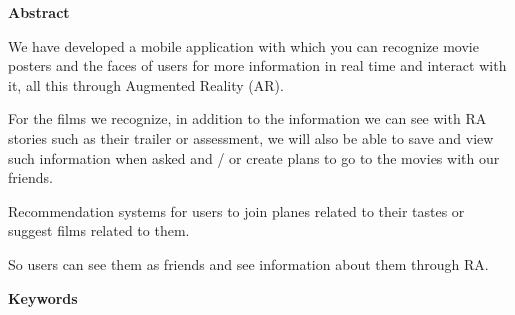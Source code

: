 
\newpage

\thispagestyle{empty}

\begin{center}

{\bf \Huge Abstract}

  \end{center}
\vspace{1cm}

We have developed a mobile application with which you can
 recognize movie posters and the faces of users for more
 information in real time and interact with it, all this
 through Augmented Reality (AR).

For the films we recognize, in addition to the information
 we can see with RA stories such as their trailer or
 assessment, we will also be able to save and view such
 information when asked and / or create plans to go to the
 movies with our friends.

Recommendation systems for users to join planes related to
their tastes or suggest films related to them.

So users can see them as friends and see information about
them through RA.

\vspace{1cm}

\begin{center}

  {\bf \Large Keywords}
  
     \end{center}
  
     \vspace{0.5cm}
     
